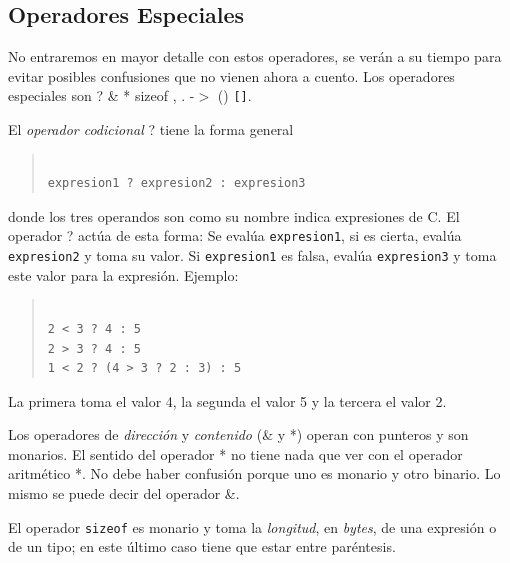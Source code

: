 \subsection{Operadores Especiales}

No entraremos en mayor detalle con estos operadores, se ver\'an a su tiempo
para evitar posibles confusiones que no vienen ahora a cuento. Los operadores
especiales son ? \& * sizeof , . -$>$ () \texttt{[]}.


El \emph{operador codicional} ? tiene la forma general

\begin{quotation}
\begin{verbatim}

expresion1 ? expresion2 : expresion3

\end{verbatim}
\end{quotation}

donde los tres operandos son como su nombre indica expresiones de C. El 
operador ? act\'ua de esta forma: Se eval\'ua \texttt{expresion1}, si es 
cierta, eval\'ua  \texttt{expresion2} y toma su valor. Si \texttt{expresion1}
es falsa, eval\'ua \texttt{expresion3} y toma este valor para la expresi\'on.
Ejemplo:

\begin{quotation}
\begin{verbatim}

2 < 3 ? 4 : 5
2 > 3 ? 4 : 5
1 < 2 ? (4 > 3 ? 2 : 3) : 5

\end{verbatim}
\end{quotation}

La primera toma el valor 4, la segunda el valor 5 y la tercera el valor 2.


Los operadores de \emph{direcci\'on} y \emph{contenido} (\& y *) operan con
punteros y son monarios. El sentido del operador * no tiene nada que ver con
el operador aritm\'etico *. No debe haber confusi\'on porque uno es monario
y otro binario. Lo mismo se puede decir del operador \&.


El operador \texttt{sizeof} es monario y toma la \emph{longitud}, en 
\emph{bytes}, de una expresi\'on o de un tipo; en este \'ultimo caso tiene que
estar entre par\'entesis.


